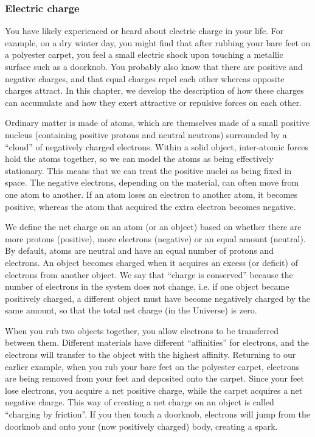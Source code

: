 \subsubsection{Electric charge}

You have likely experienced or heard about electric charge in your life. For example, on a dry winter day, you might find that after rubbing your bare feet on a polyester carpet, you feel a small electric shock upon touching a metallic surface such as a doorknob. You probably also know that there are positive and negative charges, and that equal charges repel each other whereas opposite charges attract. In this chapter, we develop the description of how these charges can accumulate and how they exert attractive or repulsive forces on each other.

Ordinary matter is made of atoms, which are themselves made of a small positive nucleus (containing positive protons and neutral neutrons) surrounded by a ``cloud'' of negatively charged electrons. Within a solid object, inter-atomic forces hold the atoms together, so we can model the atoms as being effectively stationary. This means that we can treat the positive nuclei as being fixed in space. The negative electrons, depending on the material, can often move from one atom to another. If an atom loses an electron to another atom, it becomes positive, whereas the atom that acquired the extra electron becomes negative.

We define the net charge on an atom (or an object) based on whether there are more protons (positive), more electrons (negative) or an equal amount (neutral). By default, atoms are neutral and have an equal number of protons and electrons. An object becomes charged when it acquires an excess (or deficit) of electrons from another object. We say that ``charge is conserved'' because the number of electrons in the system does not change, i.e. if one object became positively charged, a different object must have become negatively charged by the same amount, so that the total net charge (in the Universe) is zero.

When you rub two objects together, you allow electrons to be transferred between them. Different materials have different ``affinities'' for electrons, and the electrons will transfer to the object with the highest affinity. Returning to our earlier example, when you rub your bare feet on the polyester carpet, electrons are being removed from your feet and deposited onto the carpet. Since your feet lose electrons, you acquire a net positive charge, while the carpet acquires a net negative charge. This way of creating a net charge on an object is called ``charging by friction''. If you then touch a doorknob, electrons will jump from the doorknob and onto your (now positively charged) body, creating a spark.

